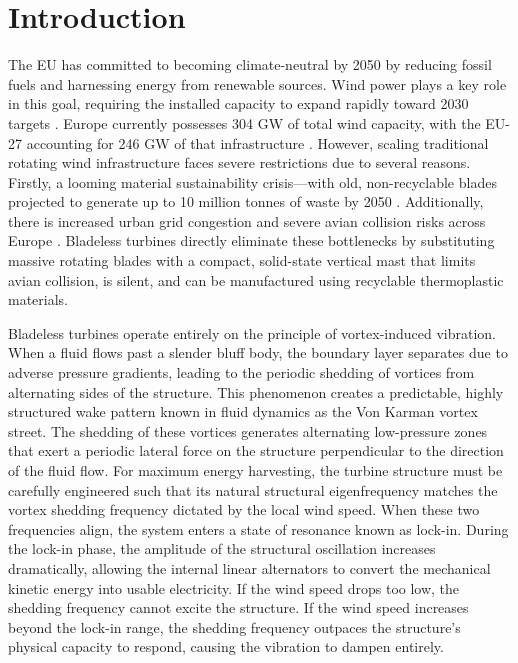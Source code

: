 \documentclass[11pt,a4paper]{article}
\begin{document}
\section{Introduction}

The EU has committed to becoming climate-neutral by 2050 by reducing fossil fuels and harnessing energy from renewable sources. Wind power plays a key role in this goal, requiring the installed capacity to expand rapidly toward 2030 targets \parencite{jrc2025}. Europe currently possesses 304 GW of total wind capacity, with the EU-27 accounting for 246 GW of that infrastructure \parencite{windeurope2026}. However, scaling traditional rotating wind infrastructure faces severe restrictions due to several reasons. Firstly, a looming material sustainability crisis—with old, non-recyclable blades projected to generate up to 10 million tonnes of waste by 2050 \parencite{jrc2025}. Additionally, there is increased urban grid congestion and severe avian collision risks across Europe \parencite{windeurope2026, iiasa2026}. Bladeless turbines directly eliminate these bottlenecks by substituting massive rotating blades with a compact, solid-state vertical mast that limits avian collision, is silent, and can be manufactured using recyclable thermoplastic materials.

Bladeless turbines operate entirely on the principle of vortex-induced vibration. When a fluid flows past a slender bluff body, the boundary layer separates due to adverse pressure gradients, leading to the periodic shedding of vortices from alternating sides of the structure. This phenomenon creates a predictable, highly structured wake pattern known in fluid dynamics as the Von Karman vortex street. The shedding of these vortices generates alternating low-pressure zones that exert a periodic lateral force on the structure perpendicular to the direction of the fluid flow. For maximum energy harvesting, the turbine structure must be carefully engineered such that its natural structural eigenfrequency matches the vortex shedding frequency dictated by the local wind speed. When these two frequencies align, the system enters a state of resonance known as lock-in. During the lock-in phase, the amplitude of the structural oscillation increases dramatically, allowing the internal linear alternators to convert the mechanical kinetic energy into usable electricity. If the wind speed drops too low, the shedding frequency cannot excite the structure. If the wind speed increases beyond the lock-in range, the shedding frequency outpaces the structure's physical capacity to respond, causing the vibration to dampen entirely.
\end{document}
